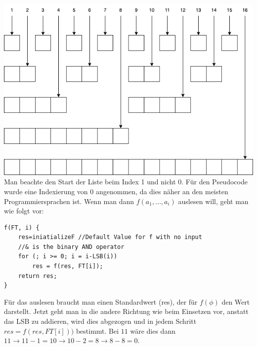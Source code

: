 \includegraphics[width=\textwidth]{./Pictures/Pic1.png}
Man beachte den Start der Liste beim Index 1 und nicht 0. Für den Pseudocode wurde eine Indexierung von 0 angenommen, da dies näher an den meisten Programmiersprachen ist.
Wenn man dann $f(a_1,\dots,a_i)$ auslesen will, geht man wie folgt vor:\\
\begin{lstlisting}
f(FT, i) {
    res=iniatializeF //Default Value for f with no input
    //& is the binary AND operator
    for (; i >= 0; i = i-LSB(i)) 
        res = f(res, FT[i]);
    return res;
}
\end{lstlisting}
Für das auslesen braucht man einen Standardwert (res), der für $f(\phi)$ den Wert darstellt. Jetzt geht man in die andere Richtung wie beim Einsetzen vor, anstatt das LSB zu addieren, wird dies abgezogen und in jedem Schritt $res=f(res,FT[i]))$ bestimmt. Bei $11$ wäre dies dann $11\rightarrow 11-1=10 \rightarrow 10-2=8 \rightarrow 8-8=0$.






